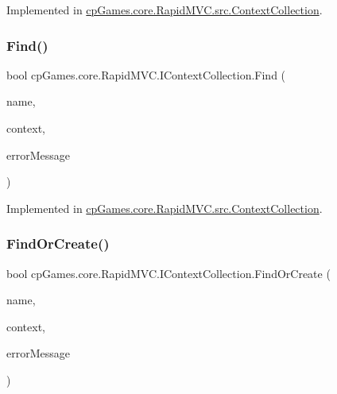 Implemented in \mbox{\hyperlink{classcp_games_1_1core_1_1_rapid_m_v_c_1_1src_1_1_context_collection_a298bbb09a2a4be911a460c436b1a913a}{cp\+Games.\+core.\+Rapid\+M\+V\+C.\+src.\+Context\+Collection}}.

\mbox{\label{interfacecp_games_1_1core_1_1_rapid_m_v_c_1_1_i_context_collection_a69e776a5c412ae0659e9df5e208ec374}} 
\subsubsection{\texorpdfstring{Find()}{Find()}}
{\footnotesize\ttfamily bool cp\+Games.\+core.\+Rapid\+M\+V\+C.\+I\+Context\+Collection.\+Find (\begin{DoxyParamCaption}\item[{string}]{name,  }\item[{out \mbox{\hyperlink{interfacecp_games_1_1core_1_1_rapid_m_v_c_1_1_i_context}{I\+Context}}}]{context,  }\item[{out string}]{error\+Message }\end{DoxyParamCaption})}



Implemented in \mbox{\hyperlink{classcp_games_1_1core_1_1_rapid_m_v_c_1_1src_1_1_context_collection_a02fb5263a77b5b36b5f3e32a98686b12}{cp\+Games.\+core.\+Rapid\+M\+V\+C.\+src.\+Context\+Collection}}.

\mbox{\label{interfacecp_games_1_1core_1_1_rapid_m_v_c_1_1_i_context_collection_a559611a4cf5c1fc2b00fbc34cbb7a9bc}} 
\subsubsection{\texorpdfstring{FindOrCreate()}{FindOrCreate()}}
{\footnotesize\ttfamily bool cp\+Games.\+core.\+Rapid\+M\+V\+C.\+I\+Context\+Collection.\+Find\+Or\+Create (\begin{DoxyParamCaption}\item[{string}]{name,  }\item[{out \mbox{\hyperlink{interfacecp_games_1_1core_1_1_rapid_m_v_c_1_1_i_context}{I\+Context}}}]{context,  }\item[{out string}]{error\+Message }\end{DoxyParamCaption})}



